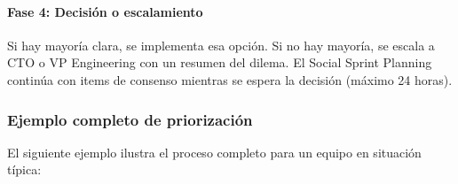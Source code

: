 \paragraph{Fase 4: Decisión o escalamiento}

Si hay mayoría clara, se implementa esa opción. Si no hay mayoría, se escala a CTO o VP Engineering con un resumen del dilema. El Social Sprint Planning continúa con items de consenso mientras se espera la decisión (máximo 24 horas).

\subsubsection{Ejemplo completo de priorización}

El siguiente ejemplo ilustra el proceso completo para un equipo en situación típica:

